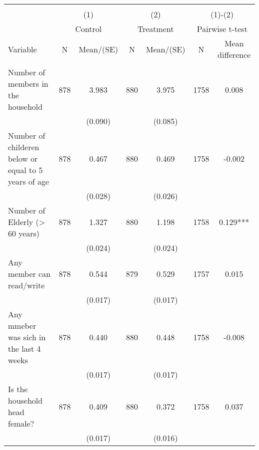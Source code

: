 
\begin{tabular}{@{\extracolsep{5pt}}lcccccc}
\\[-1.8ex]\hline \hline \\[-1.8ex]
 & \multicolumn{2}{c}{(1)}  & \multicolumn{2}{c}{(2)}  & \multicolumn{2}{c}{(1)-(2)} \\
 & \multicolumn{2}{c}{Control}  & \multicolumn{2}{c}{Treatment}  & \multicolumn{2}{c}{Pairwise t-test}  \\
Variable & N & Mean/(SE) & N & Mean/(SE) & N & Mean difference \\ \hline \\[-1.8ex] 
Number of members in the household   & 878    & 3.983    & 880    & 3.975    & 1758    & 0.008   \\
 &   & (0.090)  &   & (0.085)  &   &  \\ [1ex]
Number of childeren below or equal to 5 years of age   & 878    & 0.467    & 880    & 0.469    & 1758    & -0.002   \\
 &   & (0.028)  &   & (0.026)  &   &  \\ [1ex]
Number of Elderly (> 60 years)   & 878    & 1.327    & 880    & 1.198    & 1758    & 0.129***   \\
 &   & (0.024)  &   & (0.024)  &   &  \\ [1ex]
Any member can read/write   & 878    & 0.544    & 879    & 0.529    & 1757    & 0.015   \\
 &   & (0.017)  &   & (0.017)  &   &  \\ [1ex]
Any mmeber was sich in the last 4 weeks   & 878    & 0.440    & 880    & 0.448    & 1758    & -0.008   \\
 &   & (0.017)  &   & (0.017)  &   &  \\ [1ex]
Is the household head female?   & 878    & 0.409    & 880    & 0.372    & 1758    & 0.037   \\
 &   & (0.017)  &   & (0.016)  &   &  \\ [1ex]

\end{tabular}
